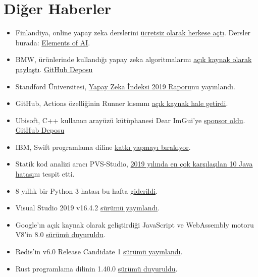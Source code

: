 \documentclass[11pt]{article}
\begin{document}
\section{Diğer Haberler}
\label{sec:org287e31f}
\begin{itemize}
\item Finlandiya, online yapay zeka derslerini \href{https://www.elementsofai.com/}{ücretsiz olarak herkese açtı}.
Dersler burada: \href{https://www.elementsofai.com/}{Elements of AI}.
\item BMW, ürünlerinde kullandığı yapay zeka algoritmalarını \href{https://www.bmwblog.com/2019/12/13/bmw-shares-ai-algorithms-used-in-production-available-on-github/}{açık kaynak olarak
paylaştı}. \href{https://github.com/BMW-InnovationLab}{GitHub Deposu}
\item Standford Üniversitesi, \href{https://hai.stanford.edu/news/introducing-ai-index-2019-report}{Yapay Zeka İndeksi 2019 Raporu}nu yayınlandı.
\item GitHub, Actions özelliğinin Runner kısmını \href{https://github.blog/changelog/2019-12-19-github-actions-the-runner-is-now-open-sourced/}{açık kaynak hale getirdi}.
\item Ubisoft, C++ kullanıcı arayüzü kütüphanesi Dear ImGui'ye \href{https://montreal.ubisoft.com/en/ubisoft-sponsors-user-interface-library-for-c-dear-imgui/}{sponsor oldu}.
\href{https://github.com/ocornut/imgui}{GitHub Deposu}
\item IBM, Swift programlama diline \href{https://forums.swift.org/t/december-12th-2019/31735}{katkı yapmayı bırakıyor}.
\item Statik kod analizi aracı PVS-Studio, \href{https://www.viva64.com/en/b/0699/}{2019 yılında en çok karşılaşılan 10
Java hatası}nı tespit etti.
\item 8 yıllık bir Python 3 hatası bu hafta \href{https://bugs.python.org/issue13153}{giderildi}.
\item Visual Studio 2019 v16.4.2 \href{https://docs.microsoft.com/en-us/visualstudio/releases/2019/release-notes\#16.4.2}{sürümü yayınlandı}.
\item Google'ın açık kaynak olarak geliştirdiği JavaScript ve WebAssembly motoru
V8'in 8.0 \href{https://v8.dev/blog/v8-release-80}{sürümü duyuruldu}.
\item Redis'in v6.0 Release Candidate 1 \href{http://antirez.com/news/131}{sürümü yayınlandı}.
\item Rust programlama dilinin 1.40.0 \href{https://blog.rust-lang.org/2019/12/19/Rust-1.40.0.html}{sürümü duyuruldu}.

\end{itemize}
\end{document}
